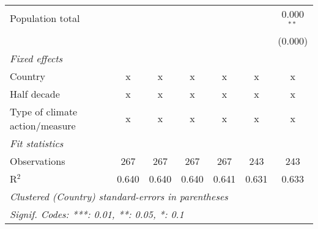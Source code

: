 \begin{tabular}{lcccccc}
   Population total                             &         &         &         &         &         & 0.000$^{**}$\\   
                                                &         &         &         &         &         & (0.000)\\   
   \emph{Fixed effects}\\
   Country                                      & x       & x       & x       & x       & x       & x\\  
   Half decade                                  & x       & x       & x       & x       & x       & x\\  
   Type of climate action/measure               & x       & x       & x       & x       & x       & x\\  
   \midrule \emph{Fit statistics}\\
   Observations                                 & 267     & 267     & 267     & 267     & 243     & 243\\  
   R$^2$                                        & 0.640   & 0.640   & 0.640   & 0.641   & 0.631   & 0.633\\  
   \midrule
   \multicolumn{7}{l}{\emph{Clustered (Country) standard-errors in parentheses}}\\
   \multicolumn{7}{l}{\emph{Signif. Codes: ***: 0.01, **: 0.05, *: 0.1}}\\
\end{tabular}
\par\endgroup


